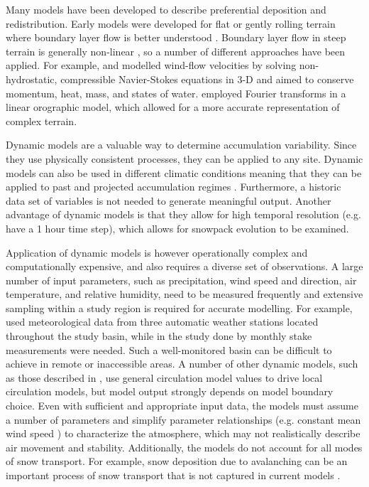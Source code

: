 \documentclass{sfuthesis}
\begin{document}
Many models have been developed to describe preferential deposition and redistribution. Early models were developed for flat or gently rolling terrain where boundary layer flow is better understood \citep{Dadic2010}. Boundary layer flow in steep terrain is generally non-linear \citep{Mott2008, Dadic2010}, so a number of different approaches have been applied.  For example, \cite{Dadic2010} and \citep{Lehning2008}modelled wind-flow velocities by solving non-hydrostatic, compressible Navier-Stokes equations in 3-D and aimed to conserve momentum, heat, mass, and states of water. \cite{Smith2004} employed Fourier transforms in a linear orographic model, which allowed for a more accurate representation of complex terrain. 

Dynamic models are a valuable way to determine accumulation variability. Since they use physically consistent processes, they can be applied to any site. Dynamic models can also be used in different climatic conditions meaning that they can be applied to past and projected accumulation regimes \citep{Clark2011}. Furthermore, a historic data set of variables is not needed to generate meaningful output. Another advantage of dynamic models is that they allow for high temporal resolution (e.g. \cite{Mott2008} have a 1 hour time step), which allows for snowpack evolution to be examined.

Application of dynamic models is however operationally complex and computationally expensive, and also requires a diverse set of observations. A large number of input parameters, such as precipitation, wind speed and direction, air temperature, and relative humidity, need to be measured frequently and extensive sampling within a study region is required for accurate modelling\citep{Liston2006}. For example, \cite{Dadic2010} used meteorological data from three automatic weather stations located throughout the study basin, while in the study done by \cite{Mott2008} monthly stake measurements were needed. Such a well-monitored basin can be difficult to achieve in remote or inaccessible areas. A number of other dynamic models, such as those described in \cite{Fowler2007}, use general circulation model values to drive local circulation models, but model output strongly depends on model boundary choice.  Even with sufficient and appropriate input data, the models must assume a number of parameters and simplify parameter relationships (e.g. constant mean wind speed \citep{Mott2008}) to characterize the atmosphere, which may not realistically describe air movement and stability. Additionally, the models do not account for all modes of snow transport. For example, snow deposition due to avalanching can be an important process of snow transport that is not captured in current models \citep{Mott2008}. 
\end{document}
